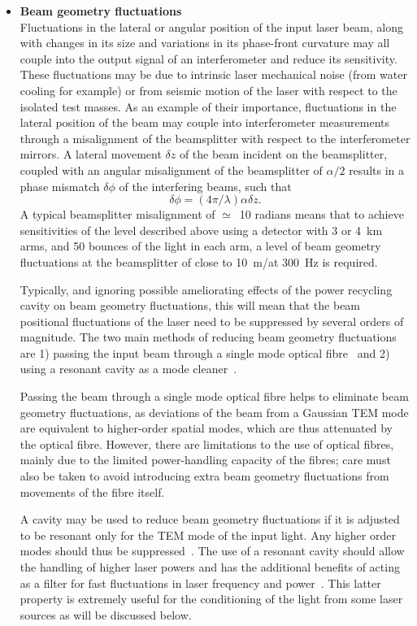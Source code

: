 \begin{itemize}
\item \textbf{Beam geometry fluctuations} \\
Fluctuations in the lateral or angular position of the input laser beam, along
with changes in its size and variations in its phase-front curvature may all
couple into the output signal of an interferometer and reduce its sensitivity.
These fluctuations may be due to intrinsic laser mechanical noise (from water
cooling for example) or from seismic motion of the laser with respect to the
isolated test masses. As an example of their importance, fluctuations in the
lateral position of the beam may couple into interferometer measurements through
a misalignment of the beamsplitter with respect to the interferometer mirrors. A
lateral movement $\delta z$ of the beam incident on the beamsplitter, coupled
with an angular misalignment of the beamsplitter of $\alpha/2$ results in a
phase mismatch $\delta \phi$ of the interfering beams, such that~\cite{Rudiger}
%
\begin{equation}
  \delta \phi = (4 \pi/\lambda) \alpha \delta z.
  \label{equation:beamgeomfluc}
\end{equation}
%
A typical beamsplitter misalignment of $\simeq$~10 radians means that to
achieve sensitivities of the level described above using a detector with 3 or
4~km arms, and 50 bounces of the light in each arm, a level of beam geometry
fluctuations at the beamsplitter of close to 10~m/\Hz at
300~Hz is required.

Typically, and ignoring possible ameliorating effects of the power recycling
cavity on beam geometry fluctuations, this will mean that the beam positional
fluctuations of the laser need to be suppressed by several orders of magnitude.
The two main methods of reducing beam geometry fluctuations are 1) passing the
input beam through a single mode optical fibre~\cite{Meersphd} and 2) using a
resonant cavity as a mode cleaner~\cite{Rudiger, Skeldon, Willke, Araya}.

Passing the beam through a single mode optical fibre helps to eliminate beam
geometry fluctuations, as deviations of the beam from a Gaussian TEM mode are
equivalent to higher-order spatial modes, which are thus attenuated by the
optical fibre.  However, there are limitations to the use of optical fibres,
mainly due to the limited power-handling capacity of the fibres; care must also
be taken to avoid introducing extra beam geometry fluctuations from movements of
the fibre itself.

A cavity may be used to reduce beam geometry fluctuations if it is adjusted to
be resonant only for the TEM mode of the input light. Any higher order modes
should thus be suppressed~\cite{Rudiger}. The use of a resonant cavity should
allow the handling of higher laser powers and has the additional benefits of
acting as a filter for fast fluctuations in laser frequency and
power~\cite{Skeldon, Willke}. This latter property is extremely useful for the
conditioning of the light from some laser sources as will be discussed below.
\end{itemize}


